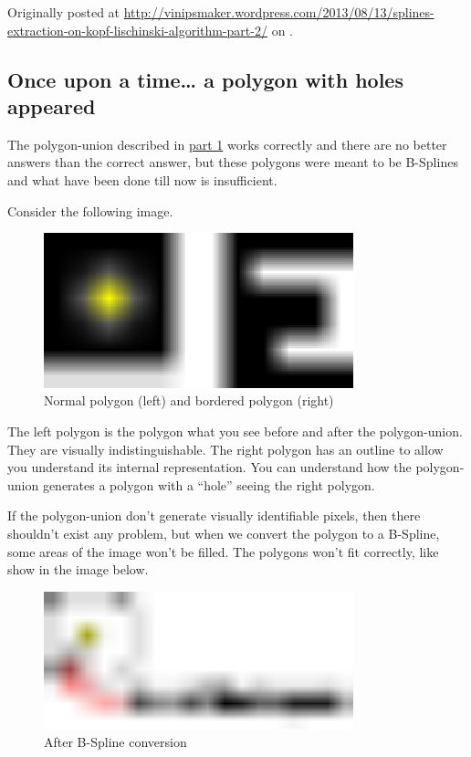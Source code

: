 Originally posted at
\url{http://vinipsmaker.wordpress.com/2013/08/13/splines-extraction-on-kopf-lischinski-algorithm-part-2/}
on .

\subsection{Once upon a time\ldots{} a polygon with holes appeared}

The polygon-union described in \hyperref[blogpart1]{part 1} works correctly and
there are no better answers than the correct answer, but these polygons were
meant to be B-Splines and what have been done till now is insufficient.

Consider the following image.

\begin{figure}[H]
  \centering
  \includegraphics[width=0.8\textwidth]{assets/polygon-holes.pdf}
  \caption{Normal polygon (left) and bordered polygon (right)}
\end{figure}

The left polygon is the polygon what you see before and after the polygon-union.
They are visually indistinguishable. The right polygon has an outline to allow
you understand its internal representation. You can understand how the
polygon-union generates a polygon with a ``hole'' seeing the right polygon.

If the polygon-union don't generate visually identifiable pixels, then there
shouldn't exist any problem, but when we convert the polygon to a B-Spline, some
areas of the image won't be filled. The polygons won't fit correctly, like show
in the image below.

\begin{figure}[H]
  \centering
  \includegraphics[width=0.8\textwidth]{assets/polygons-with-holes-and-splines.pdf}
  \caption{After B-Spline conversion}
\end{figure}

